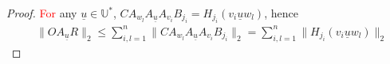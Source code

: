 \documentclass[journal,twoside,web]{ieeecolor}
\begin{document}
\begin{proof}
    \textcolor{red}{For} any $\underline{u} \in \mathbb{U}^{*}$,
     \( CA_{w_l}A_{\underline{u}}A_{v_i}B_{j_i} \!\!=\!\! H_{j_i}(v_i\underline{u}w_l) \), %
    hence 
    \begin{equation*}
      \begin{split}
      & \|OA_{\underline{u}}R\|_2 
      \le \sum_{i,l=1}^{n} \|CA_{w_l}A_{\underline{u}}A_{v_i}B_{j_i}\|_2\!\!= \!\!
         \sum_{i,l=1}^{n}  \|H_{j_i}(v_i\underline{u}w_l)\|_2 %

\end{split}
\end{equation*}
\end{proof}
\end{document}
